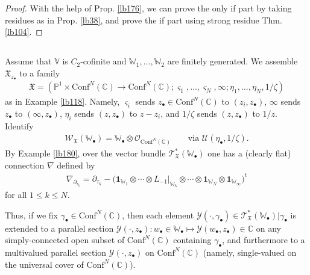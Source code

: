 \documentclass[12pt,a4paper,notitlepage]{article}
\theoremstyle{definition}
\theoremstyle{plain}
\newcommand{\fk}{\mathfrak}
\newcommand{\mc}{\mathcal}
\newcommand{\tr}{\mathrm{t}} %
\newcommand{\id}{\mathbf{1}}
\newcommand{\Conf}{\mathrm{Conf}}
\newcommand{\scr}{\mathscr}
\newcommand{\sgm}{\varsigma}
\newcommand{\blt}{\bullet}
\newcommand{\Vbb}{\mathbb V}
\newcommand{\Wbb}{\mathbb W}
\newcommand{\Cbb}{\mathbb C}
\newcommand{\Pbb}{\mathbb P}
\numberwithin{equation}{section}
\begin{document}
\begin{proof}
With the help of Prop. \ref{lb176}, we can prove the only if part by taking residues as in Prop. \ref{lb38}, and prove the if part using strong residue Thm. \ref{lb104}.
\end{proof}



\subsection{}


Assume that $\Vbb$ is $C_2$-cofinite and $\Wbb_1,\dots,\Wbb_2$ are finitely generated. We assemble $\fk X_{z_\blt}$ to a family
\begin{align}
\fk X=(\Pbb^1\times\Conf^N(\Cbb)\rightarrow\Conf^N(\Cbb);\sgm_1,\dots,\sgm_N,\infty;\eta_1,\dots,\eta_N,1/\zeta)
\end{align}
as in Example \ref{lb118}. Namely, $\sgm_i$ sends $z_\blt\in\Conf^N(\Cbb)$ to $(z_i,z_\blt)$, $\infty$ sends $z_\blt$ to $(\infty,z_\blt)$, $\eta_i$ sends $(z,z_\blt)$ to $z-z_i$, and $1/\zeta$ sends $(z,z_\blt)$ to $1/z$. Identify
\begin{align*}
\scr W_{\fk X}(\Wbb_\blt)=\Wbb_\blt\otimes\scr O_{\Conf^N(\Cbb)}\qquad\text{via }\mc U(\eta_\blt,1/\zeta).
\end{align*}
By Example \ref{lb180}, over the vector bundle $\scr T_{\fk X}^*(\Wbb_\blt)$ one has a (clearly flat) connection $\nabla$ defined by
\begin{align}
\nabla_{\partial_{\tau_k}}=\partial_{\tau_k}-\big(\id_{\Wbb_1}\otimes\cdots\otimes L_{-1}\big|_{\Wbb_k}\otimes\cdots\otimes\id_{\Wbb_N}\otimes\id_{\Wbb_\infty}\big)^\tr
\end{align}
for all $1\leq k\leq N$. 

Thus, if we fix $\gamma_\blt\in\Conf^N(\Cbb)$, then each element $\mc Y(\cdot,\gamma_\blt)\in\scr T_{\fk X}^*(\Wbb_\blt)|\gamma_\blt$ is extended to a parallel section $\mc Y(\cdot,z_\blt):w_\blt\in\Wbb_\blt\mapsto \mc Y(w_\blt,z_\blt)\in\Cbb$ on any simply-connected open subset of $\Conf^N(\Cbb)$ containing $\gamma_\blt$, and furthermore to a multivalued parallel section $\mc Y(\cdot,z_\blt)$ on $\Conf^N(\Cbb)$ (namely, single-valued on the universal cover of $\Conf^N(\Cbb)$).



\subsection{}
\end{document}
